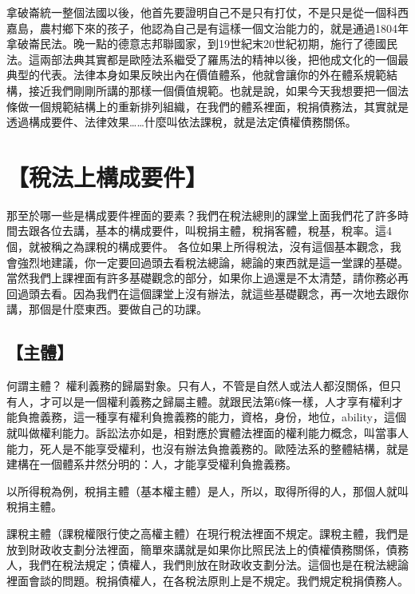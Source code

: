 \documentclass[]{ctexbook}
\begin{document}
拿破崙統一整個法國以後，他首先要證明自己不是只有打仗，不是只是從一個科西嘉島，農村鄉下來的孩子，他認為自己是有這樣一個文治能力的，就是通過1804年拿破崙民法。晚一點的德意志邦聯國家，到19世紀末20世紀初期，施行了德國民法。這兩部法典其實都是歐陸法系繼受了羅馬法的精神以後，把他成文化的一個最典型的代表。法律本身如果反映出內在價值體系，他就會讓你的外在體系規範結構，接近我們剛剛所講的那樣一個價值規範。也就是說，如果今天我想要把一個法條做一個規範結構上的重新排列組織，在我們的體系裡面，稅捐債務法，其實就是透過構成要件、法律效果\ldots\ldots 什麼叫依法課稅，就是法定債權債務關係。

\hypertarget{ux7a05ux6cd5ux4e0aux69cbux6210ux8981ux4ef6}{%
\section{【稅法上構成要件】}\label{ux7a05ux6cd5ux4e0aux69cbux6210ux8981ux4ef6}}

那至於哪一些是構成要件裡面的要素？我們在稅法總則的課堂上面我們花了許多時間去跟各位去講，基本的構成要件，叫稅捐主體，稅捐客體，稅基，稅率。這4個，就被稱之為課稅的構成要件。
各位如果上所得稅法，沒有這個基本觀念，我會強烈地建議，你一定要回過頭去看稅法總論，總論的東西就是這一堂課的基礎。當然我們上課裡面有許多基礎觀念的部分，如果你上過還是不太清楚，請你務必再回過頭去看。因為我們在這個課堂上沒有辦法，就這些基礎觀念，再一次地去跟你講，那個是什麼東西。要做自己的功課。

\hypertarget{ux4e3bux9ad4}{%
\subsection{【主體】}\label{ux4e3bux9ad4}}

何謂主體？ 權利義務的歸屬對象。只有人，不管是自然人或法人都沒關係，但只有人，才可以是一個權利義務之歸屬主體。就跟民法第6條一樣，人才享有權利才能負擔義務，這一種享有權利負擔義務的能力，資格，身份，地位，ability，這個就叫做權利能力。訴訟法亦如是，相對應於實體法裡面的權利能力概念，叫當事人能力，死人是不能享受權利，也沒有辦法負擔義務的。歐陸法系的整體結構，就是建構在一個體系井然分明的：人，才能享受權利負擔義務。

以所得稅為例，稅捐主體（基本權主體）是人，所以，取得所得的人，那個人就叫稅捐主體。

課稅主體（課稅權限行使之高權主體）在現行稅法裡面不規定。課稅主體，我們是放到財政收支劃分法裡面，簡單來講就是如果你比照民法上的債權債務關係，債務人，我們在稅法規定；債權人，我們則放在財政收支劃分法。這個也是在稅法總論裡面會談的問題。稅捐債權人，在各稅法原則上是不規定。我們規定稅捐債務人。
\end{document}
